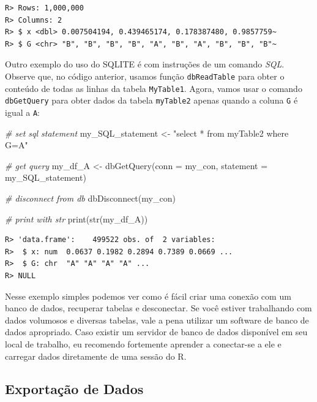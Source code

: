 \documentclass[
  11pt,
]{book}
\newenvironment{Shaded}{\begin{snugshade}}{\end{snugshade}}
\newcommand{\AttributeTok}[1]{\textcolor[rgb]{0.61,0.61,0.61}{#1}}
\newcommand{\CommentTok}[1]{\textcolor[rgb]{0.37,0.37,0.37}{\textit{#1}}}
\newcommand{\FunctionTok}[1]{\textcolor[rgb]{0,0,0}{#1}}
\newcommand{\NormalTok}[1]{#1}
\newcommand{\OtherTok}[1]{\textcolor[rgb]{0.37,0.37,0.37}{#1}}
\newcommand{\StringTok}[1]{\textcolor[rgb]{0.5,0.5,0.5}{#1}}
\begin{document}
\begin{verbatim}
R> Rows: 1,000,000
R> Columns: 2
R> $ x <dbl> 0.007504194, 0.439465174, 0.178387480, 0.9857759~
R> $ G <chr> "B", "B", "B", "B", "A", "B", "A", "B", "B", "B"~
\end{verbatim}

Outro exemplo do uso do SQLITE é com instruções de um comando \emph{SQL}. Observe que, no código anterior, usamos função \texttt{dbReadTable} para obter o conteúdo de todas as linhas da tabela \texttt{MyTable1}. Agora, vamos usar o comando \texttt{dbGetQuery} para obter dados da tabela \texttt{myTable2} apenas quando a coluna \texttt{G} é igual a \texttt{A}: 

\begin{Shaded}
\begin{Highlighting}[]
\CommentTok{\# set sql statement}
\NormalTok{my\_SQL\_statement }\OtherTok{\textless{}{-}} \StringTok{"select * from myTable2 where G=\textquotesingle{}A\textquotesingle{}"}

\CommentTok{\# get query}
\NormalTok{my\_df\_A }\OtherTok{\textless{}{-}} \FunctionTok{dbGetQuery}\NormalTok{(}\AttributeTok{conn =}\NormalTok{ my\_con, }
                      \AttributeTok{statement =}\NormalTok{ my\_SQL\_statement)}

\CommentTok{\# disconnect from db}
\FunctionTok{dbDisconnect}\NormalTok{(my\_con)}

\CommentTok{\# print with str}
\FunctionTok{print}\NormalTok{(}\FunctionTok{str}\NormalTok{(my\_df\_A))}
\end{Highlighting}
\end{Shaded}

\begin{verbatim}
R> 'data.frame':    499522 obs. of  2 variables:
R>  $ x: num  0.0637 0.1982 0.2894 0.7389 0.0669 ...
R>  $ G: chr  "A" "A" "A" "A" ...
R> NULL
\end{verbatim}

Nesse exemplo simples podemos ver como é fácil criar uma conexão com um banco de dados, recuperar tabelas e desconectar. Se você estiver trabalhando com dados volumosos e diversas tabelas, vale a pena utilizar um software de banco de dados apropriado. Caso existir um servidor de banco de dados disponível em seu local de trabalho, eu recomendo fortemente aprender a conectar-se a ele e carregar dados diretamente de uma sessão do R.

\hypertarget{exportauxe7uxe3o-de-dados-4}{%
\subsection{Exportação de Dados}\label{exportauxe7uxe3o-de-dados-4}}
\end{document}
